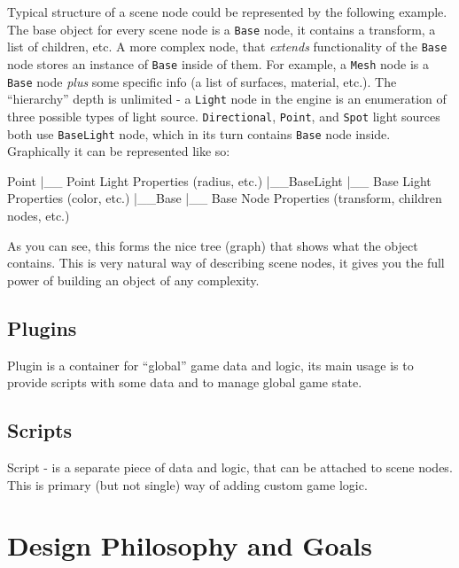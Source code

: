 \documentclass[
]{book}
\newenvironment{Shaded}{\begin{snugshade}}{\end{snugshade}}
\newcommand{\NormalTok}[1]{#1}
\theoremstyle{definition}
\theoremstyle{definition}
\theoremstyle{definition}
\theoremstyle{definition}
\theoremstyle{remark}
\begin{document}
Typical structure of a scene node could be represented by the following example. The base object for every scene node is a \texttt{Base} node, it contains a transform, a list of children, etc. A more complex node, that \emph{extends} functionality of the \texttt{Base} node stores an instance of \texttt{Base} inside of them. For example, a \texttt{Mesh} node is a \texttt{Base} node \emph{plus} some specific info (a list of surfaces, material, etc.). The ``hierarchy'' depth is unlimited - a \texttt{Light} node in the engine is an enumeration of three possible types of light source. \texttt{Directional}, \texttt{Point}, and \texttt{Spot} light sources both use \texttt{BaseLight} node, which in its turn contains \texttt{Base} node inside. Graphically it can be represented like so:

\begin{Shaded}
\begin{Highlighting}[]
\NormalTok{\textasciigrave{}Point\textasciigrave{}}
\NormalTok{|\_\_ Point Light Properties (radius, etc.)}
\NormalTok{|\_\_\textasciigrave{}BaseLight\textasciigrave{}}
\NormalTok{   |\_\_ Base Light Properties (color, etc.)}
\NormalTok{   |\_\_\textasciigrave{}Base\textasciigrave{}}
\NormalTok{      |\_\_ Base Node Properties (transform, children nodes, etc.)}
\end{Highlighting}
\end{Shaded}

As you can see, this forms the nice tree (graph) that shows what the object contains. This is very natural way of describing scene nodes, it gives you the full power of building an object of any complexity.

\subsection{Plugins}\label{plugins}

Plugin is a container for ``global'' game data and logic, its main usage is to provide scripts with some data and to manage global game state.

\subsection{Scripts}\label{scripts}

Script - is a separate piece of data and logic, that can be attached to scene nodes. This is primary (but not single) way of adding custom game logic.

\section{Design Philosophy and Goals}\label{design-philosophy-and-goals}
\end{document}
